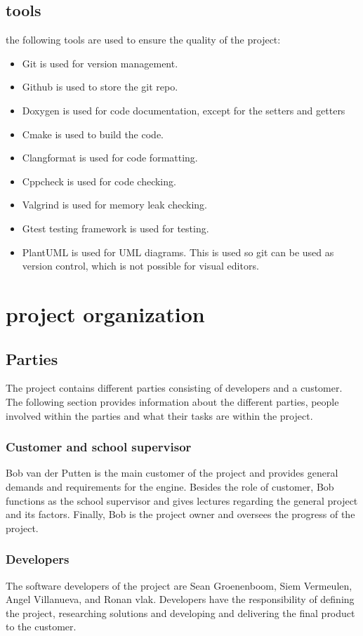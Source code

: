 \documentclass{article} %
\begin{document}
\subsection{tools}
the following tools are used to ensure the quality of the project:
\begin{itemize}
    \item Git is used for version management.
    \item Github is used to store the git repo.
    \item Doxygen is used for code documentation, except for the setters and getters
    \item Cmake is used to build the code.
    \item Clangformat is used for code formatting.
    \item Cppcheck is used for code checking.
    \item Valgrind is used for memory leak checking.
    \item Gtest testing framework is used for testing.
    \item PlantUML is used for UML diagrams. This is used so git can be used as version control, which is not possible for visual editors.
\end{itemize}
\newpage

\section{project organization}

\subsection{Parties}
The project contains different parties consisting of developers and a customer.
The following section provides information about the different parties, people involved within the parties and what their tasks are within the project.

\subsubsection{Customer and school supervisor}
Bob van der Putten is the main customer of the project and provides general demands and requirements for the engine.
Besides the role of customer, Bob functions as the school supervisor and gives lectures regarding the general project and its factors.
Finally, Bob is the project owner and oversees the progress of the project.


\subsubsection{Developers}
The software developers of the project are Sean Groenenboom, Siem Vermeulen, Angel Villanueva, and Ronan vlak.
Developers have the responsibility of defining the project, researching solutions and developing and delivering the final product to the customer.
\end{document}
